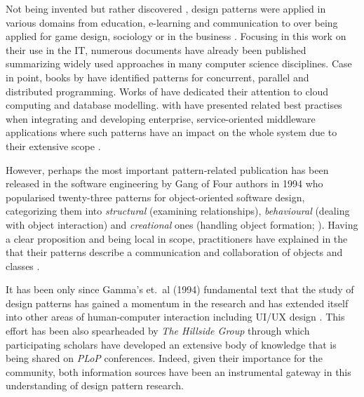 Not being invented but rather discovered , design patterns were applied in various domains from education, e-learning and communication to over being applied for game design, sociology or in the business \parencites{Gwendolyn2010}{EducationPatterns2012}[63]{DeardenHCI2006}. 
Focusing in this work on their use in the \ac{IT}, numerous documents have already been published summarizing widely used approaches in many computer science disciplines.
Case in point, books by \textcites{Brich1995}{Mattson2005} have identified patterns for concurrent, parallel and distributed programming.
Works of \textcites{Erl2015}{Fehling2014}{Blaha2010} have dedicated their attention to cloud computing and database modelling. 
\textcite{Fowler2002} with \textcite{BobbyGregor2012} have presented related best practises when integrating and developing enterprise, service-oriented middleware applications where such patterns have an impact on the whole system due to their extensive scope \parencite{BruseDougals2002}.

However, perhaps the most important pattern-related publication has been released in the software engineering by Gang of Four authors in 1994 who popularised twenty-three patterns for object-oriented software design, categorizing them into \emph{structural} (examining relationships), \emph{behavioural} (dealing with object interaction) and \emph{creational} ones (handling object formation; \cite{DongPan1998TheEngine}). 
Having a clear proposition and being local in scope, practitioners have explained in the  that their patterns describe a communication and collaboration of objects and classes  \parencites[853]{HeffreMheer2006}[39]{Schmidt:1996:SP:236156.236164}.

It has been only since Gamma's et.\ al (1994) fundamental text that the study of design patterns has gained a momentum in the research and has extended itself into other areas of human-computer interaction including \acs{UI/UX} design \parencites{DongPan1998TheEngine}{DeardenHCI2006}.
This effort has been also spearheaded by \emph{The Hillside Group} through which participating scholars have developed an extensive body of knowledge that is being shared on \emph{\ac{PLoP}} conferences.
Indeed, given their importance for the community, both information sources have been an instrumental gateway in this understanding of design pattern research.

